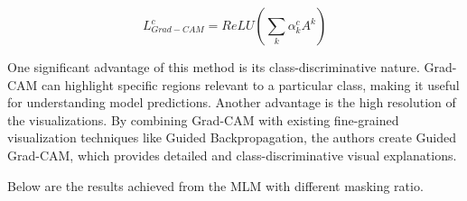 \begin{displaymath}
    L^c_{Grad-CAM} = ReLU(\sum_k\alpha^c_kA^k)
\end{displaymath}

One significant advantage of this method is its class-discriminative nature. Grad-CAM can highlight specific regions relevant to a particular class, making it useful for understanding model predictions. Another advantage is the high resolution of the visualizations. By combining Grad-CAM with existing fine-grained visualization techniques like Guided Backpropagation, the authors create Guided Grad-CAM, which provides detailed and class-discriminative visual explanations.


Below are the results achieved from the MLM with different masking ratio.





